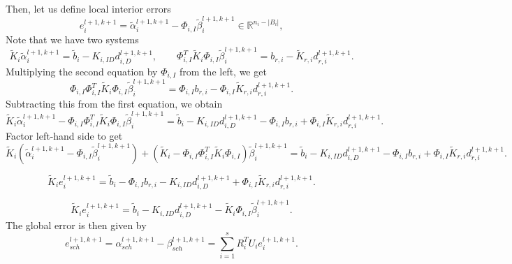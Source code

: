 \documentclass[a4paper, 11pt]{article}
\theoremstyle{plain}
\theoremstyle{definition}
\theoremstyle{remark}
\begin{document}
Then, let us define local interior errors
\begin{equation*}
    e_{i}^{l+1, k+1} = \tilde{\alpha}_{i}^{l+1, k+1} - \Phi_{i, I}\tilde{\beta}_{i}^{l+1, k+1}\in \mathbb{R}^{n_{i} - \lvert B_{i}\rvert},
\end{equation*}
Note that we have two systems
\begin{equation*}
    \tilde{K}_{i}\tilde{\alpha}_{i}^{l+1, k+1} = \tilde{b}_{i} - K_{i, ID}d^{l+1, k+1}_{i, D}, \qquad \Phi_{i, I}^{T}\tilde{K}_{i}\Phi_{i, I}\tilde{\beta}_{i}^{l+1, k+1} = b_{r, i} - \tilde{K}_{r, i}d^{l+1, k+1}_{r, i}.
\end{equation*}
Multiplying the second equation by $\Phi_{i, I}$ from the left, we get
\begin{equation*}
    \Phi_{i, I}\Phi_{i, I}^{T}\tilde{K}_{i}\Phi_{i, I}\tilde{\beta}_{i}^{l+1, k+1} = \Phi_{i, I}b_{r, i} - \Phi_{i, I}\tilde{K}_{r, i}d^{l+1, k+1}_{r, i}.
\end{equation*}
Subtracting this from the first equation, we obtain
\begin{equation*}
    \tilde{K}_{i}\tilde{\alpha}_{i}^{l+1, k+1} - \Phi_{i, I}\Phi_{i, I}^{T}\tilde{K}_{i}\Phi_{i, I}\tilde{\beta}_{i}^{l+1, k+1} = \tilde{b}_{i} - K_{i, ID}d^{l+1, k+1}_{i, D} - \Phi_{i, I}b_{r, i} + \Phi_{i, I}\tilde{K}_{r, i}d^{l+1, k+1}_{r, i}.
\end{equation*}
Factor left-hand side to get
\begin{equation*}
    \tilde{K}_{i}\left(\tilde{\alpha}_{i}^{l+1, k+1} - \Phi_{i, I}\tilde{\beta}_{i}^{l+1, k+1}\right) + \left(\tilde{K}_{i} - \Phi_{i, I}\Phi_{i, I}^{T}\tilde{K}_{i}\Phi_{i, I}\right)\tilde{\beta}_{i}^{l+1, k+1} = \tilde{b}_{i} - K_{i, ID}d^{l+1, k+1}_{i, D} - \Phi_{i, I}b_{r, i} + \Phi_{i, I}\tilde{K}_{r, i}d^{l+1, k+1}_{r, i}.
\end{equation*}

\begin{equation*}
    \tilde{K}_{i}e_{i}^{l+1, k+1} = \tilde{b}_{i} - \Phi_{i, I}b_{r, i} - K_{i, ID}d^{l+1, k+1}_{i, D} + \Phi_{i, I}\tilde{K}_{r, i}d^{l+1, k+1}_{r, i}.
\end{equation*}

\begin{equation*}
    \tilde{K}_{i}e_{i}^{l+1, k+1} = \tilde{b}_{i} - K_{i, ID}d^{l+1, k+1}_{i, D} - \tilde{K}_{i}\Phi_{i, I}\tilde{\beta}_{i}^{l+1, k+1}.
\end{equation*}
The global error is then given by
\begin{equation*}
    e_{sch}^{l+1, k+1} = \alpha_{sch}^{l+1, k+1} - \beta_{sch}^{l+1, k+1} = \sum_{i = 1}^{s}R_{i}^{T}U_{i}e^{l+1, k + 1}_{i}.
\end{equation*}
\end{document}
